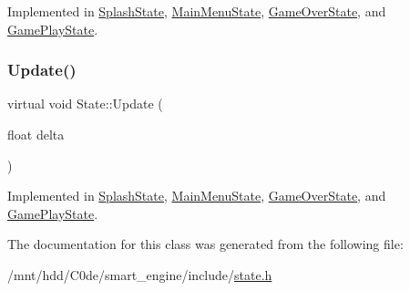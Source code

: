 Implemented in \hyperlink{classSplashState_a5efb6f0ede61ec76ee2dd72a6b24c57c}{Splash\+State}, \hyperlink{classMainMenuState_af675ec319923f1cf22446808a7735dea}{Main\+Menu\+State}, \hyperlink{classGameOverState_ac9c9ef71b0a12940ac5caa7763f23fdc}{Game\+Over\+State}, and \hyperlink{classGamePlayState_a4bd296aa04088a3d8249f569e86f21a7}{Game\+Play\+State}.

\mbox{\label{classState_aac0d3fdee1341e168af730b8f31a7bf1}} 
\subsubsection{\texorpdfstring{Update()}{Update()}}
{\footnotesize\ttfamily virtual void State\+::\+Update (\begin{DoxyParamCaption}\item[{float}]{delta }\end{DoxyParamCaption})\hspace{0.3cm}{\ttfamily [pure virtual]}}



Implemented in \hyperlink{classSplashState_af19b293ae1e914e13db4382115e56d2c}{Splash\+State}, \hyperlink{classMainMenuState_a1605be0d2e5228643d911c7069db3196}{Main\+Menu\+State}, \hyperlink{classGameOverState_a4dc49d576a9435531f502660119800a9}{Game\+Over\+State}, and \hyperlink{classGamePlayState_a19bcc1ff2a83a3aa001010ae35d67b85}{Game\+Play\+State}.



The documentation for this class was generated from the following file\+:\begin{DoxyCompactItemize}
\item 
/mnt/hdd/\+C0de/smart\+\_\+engine/include/\hyperlink{state_8h}{state.\+h}\end{DoxyCompactItemize}
